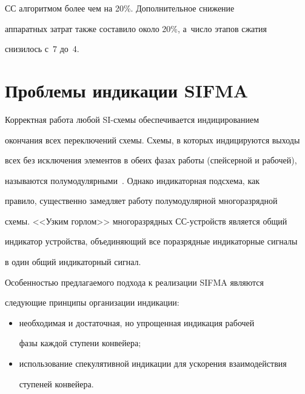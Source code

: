 СС алгоритмом более чем на 20\%. Дополнительное снижение

аппаратных затрат также составило около 20\%, а~чис\-ло этапов сжатия

снизилось с~7 до~4.



\vspace*{-6pt}





\section{Проблемы индикации SIFMA}



\vspace*{-3pt}



      Корректная работа любой SI-схемы обеспечивается индицированием

окончания всех переключений схемы. Схемы, в которых индицируются выходы

всех без исключения элементов в обеих фазах работы (спейсерной и рабочей),

называются полумодулярными~\cite{17-st1}. Однако индикаторная подсхема, как

правило, существенно замедляет работу полумодулярной многоразрядной

схемы. <<Узким горлом>> многоразрядных СС-устрой\-ств является общий

индикатор устройства, объединяющий все поразрядные индикаторные сигналы

в один общий индикаторный сигнал.



      Особенностью предлагаемого подхода к реализации SIFMA являются

следующие принципы организации индикации:

      \begin{itemize}

      \item необходимая и достаточная, но упрощенная индикация рабочей

фазы каждой ступени конвейера;

\item  использование спекулятивной индикации для ускорения взаимодействия

ступеней конвейера.

      \end{itemize}



